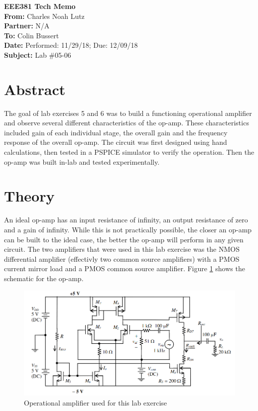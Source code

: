 \documentclass[11pt]{article}
\begin{document}
	{\Huge\textbf{EEE381 Tech Memo}}\\
	\hfill \break
	\textbf{From:} Charles Noah Lutz\\
	\textbf{Partner:} N/A\\
	\textbf{To:} Colin Bussert\\
	\textbf{Date:} Performed: 11/29/18; Due: 12/09/18\\
	\textbf{Subject:} Lab \#05-06

	\section{Abstract}
	The goal of lab exercises 5 and 6 was to build a functioning operational amplifier
	and observe several different characteristics of the op-amp. These characteristics
	included gain of each individual stage, the overall gain and the frequency response
	of the overall op-amp. The circuit was first designed using hand calculations, then
	tested in a PSPICE simulator to verify the operation. Then the op-amp was built in-lab
	and tested experimentally. 
	
	\section{Theory}
	An ideal op-amp has an input resistance of infinity, an output resistance
	of zero and a gain of infinity. While this is not practically possible, the closer an op-amp can be 
	built to the ideal case, the better the op-amp will perform in any given circuit.
	The two amplifiers that were used in this lab exercise was the NMOS differential amplifier 
	(effectivly two common source amplifiers) with a PMOS current mirror load and a PMOS
	common source amplifier. Figure \ref{fig:op-amp} shows the schematic for the op-amp. \\
	\begin{figure}[H]
		\includegraphics[width=\textwidth]{op_amp_schematic.png}
		\caption{Operational amplifier used for this lab exercise}
		\label{fig:op-amp}
	\end{figure}
	
\end{document}
